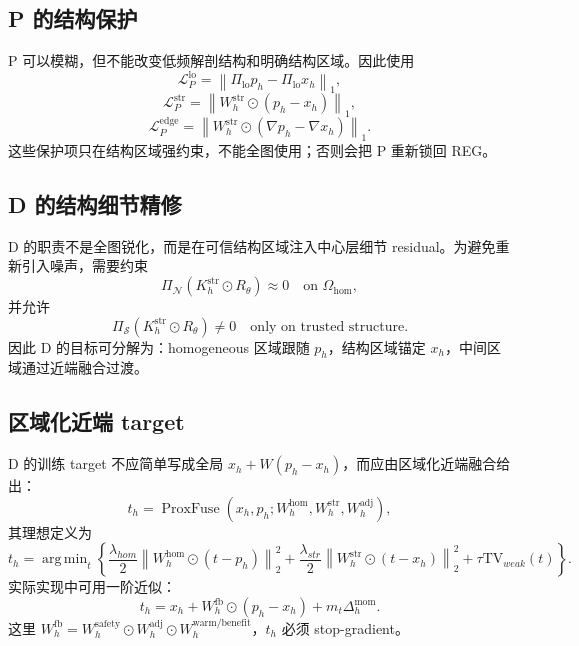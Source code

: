 \documentclass[11pt,a4paper,UTF8,fontset=fandol]{ctexart}
\theoremstyle{definition}
\DeclareMathOperator{\ProxFuse}{ProxFuse}
\DeclareMathOperator{\argmin}{arg\,min}
\begin{document}
\subsection{P 的结构保护}

P 可以模糊，但不能改变低频解剖结构和明确结构区域。因此使用
\begin{equation}
\mathcal L_P^{\mathrm{lo}}=\left\|\Pi_{\mathrm{lo}}p_h-\Pi_{\mathrm{lo}}x_h\right\|_1,
\end{equation}
\begin{equation}
\mathcal L_P^{\mathrm{str}}=\left\|W_h^{\mathrm{str}}\odot(p_h-x_h)\right\|_1,
\end{equation}
\begin{equation}
\mathcal L_P^{\mathrm{edge}}=\left\|W_h^{\mathrm{str}}\odot(\nabla p_h-\nabla x_h)\right\|_1.
\end{equation}
这些保护项只在结构区域强约束，不能全图使用；否则会把 P 重新锁回 REG。

\subsection{D 的结构细节精修}

D 的职责不是全图锐化，而是在可信结构区域注入中心层细节 residual。为避免重新引入噪声，需要约束
\begin{equation}
\Pi_{\mathcal N}\left(K_h^{\mathrm{str}}\odot R_\theta\right)\approx0\quad \text{on }\Omega_{\mathrm{hom}},
\end{equation}
并允许
\begin{equation}
\Pi_{\mathcal S}\left(K_h^{\mathrm{str}}\odot R_\theta\right)\ne0\quad \text{only on trusted structure}.
\end{equation}
因此 D 的目标可分解为：homogeneous 区域跟随 $p_h$，结构区域锚定 $x_h$，中间区域通过近端融合过渡。

\subsection{区域化近端 target}

D 的训练 target 不应简单写成全局 $x_h+W(p_h-x_h)$，而应由区域化近端融合给出：
\begin{equation}
 t_h=\ProxFuse(x_h,p_h;W_h^{\mathrm{hom}},W_h^{\mathrm{str}},W_h^{\mathrm{adj}}),
\end{equation}
其理想定义为
\begin{equation}
 t_h=\argmin_t\left\{
\frac{\lambda_{hom}}{2}\left\|W_h^{\mathrm{hom}}\odot(t-p_h)\right\|_2^2+
\frac{\lambda_{str}}{2}\left\|W_h^{\mathrm{str}}\odot(t-x_h)\right\|_2^2+
\tau\mathrm{TV}_{weak}(t)
\right\}.
\end{equation}
实际实现中可用一阶近似：
\begin{equation}
 t_h=x_h+W_h^{\mathrm{fb}}\odot(p_h-x_h)+m_t\Delta_h^{\mathrm{mom}}.
\end{equation}
这里 $W_h^{\mathrm{fb}}=W_h^{\mathrm{safety}}\odot W_h^{\mathrm{adj}}\odot W_h^{\mathrm{warm/benefit}}$，$t_h$ 必须 stop-gradient。
\end{document}
